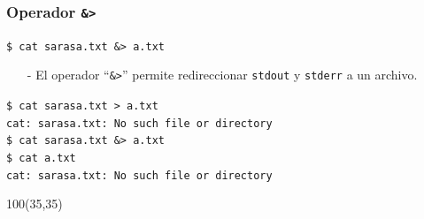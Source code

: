\documentclass{beamer}
\begin{document}
\begin{frame}[fragile,t]
    \frametitle{Operador \texttt{\&>}}
    \begin{block}{\vspace*{-3ex}}
    \texttt{\$}\verb: cat sarasa.txt &> a.txt:
    \vspace*{0.5ex}
    \end{block}
    \begin{itemize}
    \item[-] El operador ``\verb|&>|'' permite redireccionar \verb|stdout| y \verb|stderr| a un archivo.
    \end{itemize}
    \vspace{1.8cm}
    \pause
    \begin{block}{\vspace*{-3ex}}
    \texttt{\$}\verb: cat sarasa.txt > a.txt:\\
    \verb;cat: sarasa.txt: No such file or directory;\\
    \vspace{0.2cm}
    \texttt{\$}\verb: cat sarasa.txt &> a.txt:\\
    \texttt{\$}\verb: cat a.txt:\\
    \verb;cat: sarasa.txt: No such file or directory;
    \vspace*{0.5ex}
    \end{block}
    \begin{textblock}{100}(35,35)
    \begin{center}
    \end{center}
    \end{textblock}
\end{frame}
\end{document}
